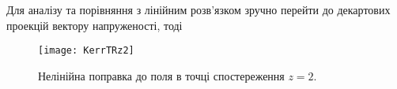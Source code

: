 Для аналізу та порівняння з лінійним розв'язком зручно перейти до 
декартових проекцій вектору напруженості, тоді

%
%



\begin{figure}[htbp] \begin{center}
\texttt{[image: KerrTRz2]}
\caption{Нелінійна поправка до поля в точці спостереження $ z = 2 $.} 
\label{fig:KerrTRz2}
\end{center} \end{figure}

